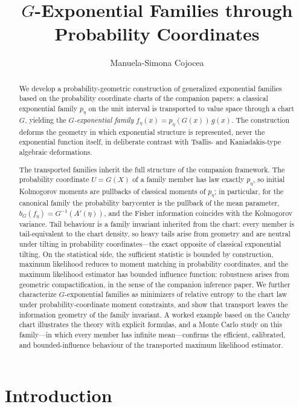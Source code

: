 \documentclass[11pt]{article}
\title{$G$-Exponential Families through Probability Coordinates}
\author{Manuela-Simona Cojocea}
\date{}
\theoremstyle{definition}
\begin{document}
\maketitle

\begin{abstract}
We develop a probability-geometric construction of generalized exponential
families based on the probability coordinate charts of the companion papers:
a classical exponential family $p_\eta$ on the unit interval is transported
to value space through a chart $G$, yielding the \emph{$G$-exponential
family} $f_\eta(x)=p_\eta(G(x))\,g(x)$. The construction deforms the
geometry in which exponential structure is represented, never the
exponential function itself, in deliberate contrast with Tsallis- and
Kaniadakis-type algebraic deformations.

The transported families inherit the full structure of the companion
framework. The probability coordinate $U=G(X)$ of a family
member has law exactly $p_\eta$, so initial Kolmogorov moments are pullbacks
of classical moments of $p_\eta$; in particular, for the canonical family
the probability barycenter is the pullback of the mean parameter,
$b_G(f_\eta)=G^{-1}(A'(\eta))$, and the Fisher information coincides with
the Kolmogorov variance. Tail behaviour is a family invariant inherited
from the chart: every member is tail-equivalent to the chart density, so
heavy tails arise from geometry and are neutral under tilting in
probability coordinates---the exact opposite of classical exponential
tilting. On the statistical side, the sufficient statistic is bounded by
construction, maximum likelihood reduces to moment matching in probability
coordinates, and the maximum likelihood estimator has bounded influence
function: robustness arises from geometric compactification, in the sense
of the companion inference paper. We further characterize $G$-exponential
families as minimizers of relative entropy to the chart law under
probability-coordinate moment constraints, and show that transport leaves
the information geometry of the family invariant. A worked example based on
the Cauchy chart illustrates the theory with explicit formulas, and a Monte
Carlo study on this family---in which every member has infinite mean---confirms
the efficient, calibrated, and bounded-influence behaviour of the
transported maximum likelihood estimator.
\end{abstract}

\section{Introduction}\label{sec:intro}
\end{document}
